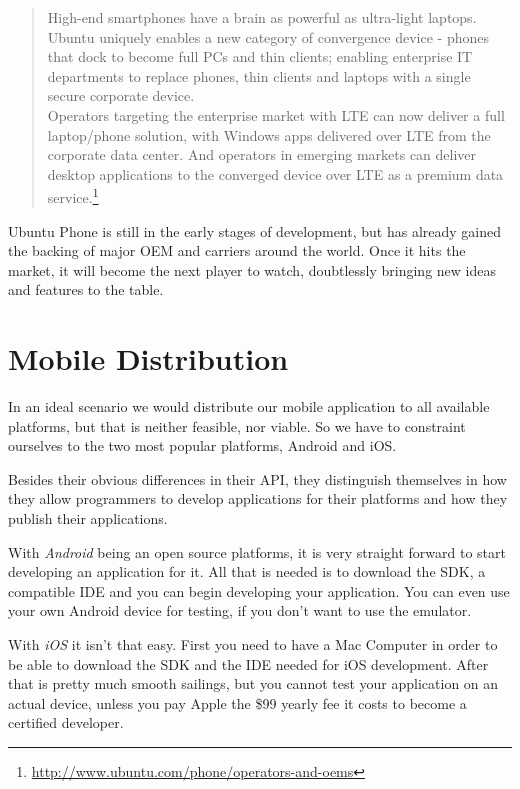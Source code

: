 \begin{quotation}
High-end smartphones have a brain as powerful as ultra-light laptops. Ubuntu uniquely enables a new category of convergence device - phones that dock to become full PCs and thin clients; enabling enterprise IT departments to replace phones, thin clients and laptops with a single secure corporate device.\\

Operators targeting the enterprise market with LTE can now deliver a full laptop/phone solution, with Windows apps delivered over LTE from the corporate data center. And operators in emerging markets can deliver desktop applications to the converged device over LTE as a premium data service.\footnote{\url{http://www.ubuntu.com/phone/operators-and-oems}}
\end{quotation}


Ubuntu Phone is still in the early stages of development, but has already gained the backing of major \ac{OEM} and carriers around the world. Once it hits the market, it will become the next player to watch, doubtlessly bringing new ideas and features to the table.

\section{Mobile Distribution}

In an ideal scenario we would distribute our mobile application to all available platforms, but that is neither feasible, nor viable. So we have to constraint ourselves to the two most popular platforms, Android and iOS.

Besides their obvious differences in their \ac{API}, they distinguish themselves in how they allow programmers to develop applications for their platforms and how they publish their applications.

With \textit{Android} being an open source platforms, it is very straight forward to start developing an application for it. All that is needed is to download the \ac{SDK}, a compatible \ac{IDE} and you can begin developing your application. You can even use your own Android device for testing, if you don't want to use the emulator.

With \textit{iOS} it isn't that easy. First you need to have a Mac Computer in order to be able to download the \ac{SDK} and the \ac{IDE} needed for iOS development. After that is pretty much smooth sailings, but you cannot test your application on an actual device, unless you pay Apple the \$99 yearly fee it costs to become a certified developer.

